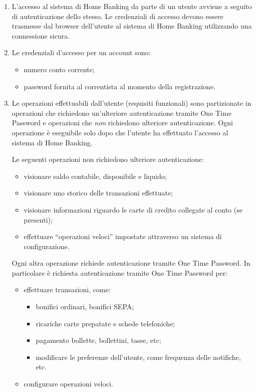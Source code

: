 \begin{enumerate}
	\item \label{itm:utente:non-funzionali:sicurezza:accesso} L'accesso al sistema di Home Banking da parte di un utente avviene a seguito di autenticazione dello stesso.
		Le credenziali di accesso devono essere trasmesse dal browser dell'utente al sistema di Home Banking utilizzando una connessione sicura.
	\item \label{itm:utente:non-funzionali:sicurezza:credenziali} Le credenziali d'accesso per un account sono:
		\begin{itemize}
			\item numero conto corrente;
			\item password fornita al correntista al momento della registrazione.
		\end{itemize}
	\item \label{itm:utente:non-funzionali:sicurezza:operazioni} Le operazioni effettuabili dall'utente (requisiti funzionali) sono partizionate in operazioni che richiedono un'ulteriore autenticazione tramite One Time Password e operazioni che \emph{non} richiedono ulteriore autenticazione.
	Ogni operazione \`e eseguibile solo dopo che l'utente ha effettuato l'accesso al sistema di Home Banking.

	Le seguenti operazioni non richiedono ulteriore autenticazione:
	\begin{itemize}
		\item visionare saldo contabile, disponibile e liquido;
		\item visionare uno storico delle transazioni effettuate;
		\item visionare informazioni riguardo le carte di credito collegate al conto (se presenti);
		\item effettuare ``operazioni veloci'' impostate attraverso un sistema di configurazione.
	\end{itemize}
	
	Ogni altra operazione richiede autenticazione tramite One Time Password.
	In particolare \`e richiesta autenticazione tramite One Time Password per:
	\begin{itemize}
		\item effettuare transazioni, come:
		\begin{itemize}
			\item bonifici ordinari, bonifici SEPA;
			\item ricariche carte prepatate e schede telefoniche;
			\item pagamento bollette, bollettini, tasse, etc;
			\item modificare le preferenze dell'utente, come frequenza delle notifiche, etc.
		\end{itemize}
		\item configurare operazioni veloci.
	\end{itemize}
\end{enumerate}

